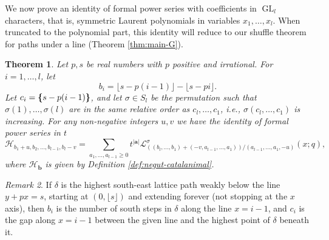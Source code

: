 \documentclass[12pt]{amsart}
\newtheorem{thm}{Theorem}[subsection]
\theoremstyle{definition}
\theoremstyle{remark}
\newtheorem{remark}[thm]{Remark}
\newcommand{\aA}{{\mathbf a}}
\newcommand{\bb}{{\mathbf b}}
\newcommand{\Hcat}{{\mathcal H}}  %
\newcommand{\Lcal}{{\mathcal L}}
\DeclareMathOperator{\GL}{GL}
\newcommand{\fp}[1]{{\boldsymbol \{} #1 {\boldsymbol \}}}
\begin{document}
We now prove an identity of formal power series with coefficients in
$\GL _{l}$ characters, that is, symmetric Laurent polynomials in
variables $x_{1},\ldots,x_{l}$.  When truncated to the polynomial
part, this identity will reduce to our shuffle theorem for paths under
a line (Theorem \ref{thm:main-G}).

\begin{thm}\label{thm:main-L}
Let $p ,s$ be real numbers with $p$ positive and irrational.  For $i =
1,\ldots,l$, let
\[
b_{i} = \lfloor s-p(i-1) \rfloor - \lfloor s-pi \rfloor.
\]
Let $c_{i} = \fp{s-p(i-1)}$, and let $\sigma \in S_{l}$ be the
permutation such that $\sigma (1),\ldots,\sigma (l)$ are in the same
relative order as $c_{l},\ldots,c_{1}$, i.e., $\sigma
(c_{l},\ldots,c_{1})$ is increasing.
For any non-negative integers $u,v$ we have the identity of formal
power series in $t$
\begin{equation}\label{e:main-L}
\Hcat _{b_{1}+u,b_{2},\ldots,b_{l-1},b_{l}-v} = \sum
_{a_{1},\ldots,a_{l-1}\geq 0} t^{|\aA |} \Lcal ^{\sigma
}_{((b_{l},\ldots,b_{1}) + (-v,a_{l-1},\ldots,a_{1})) /
(a_{l-1},\ldots,a_{1},-u)}(x;q),
\end{equation}
where $\Hcat _{\bb }$ is given by Definition
\ref{def:negut-catalanimal}.

\end{thm}

\begin{remark}\label{rem:extended-path}
If $\delta $ is the highest south-east lattice path weakly below the
line $y+px = s$, starting at $(0,\lfloor s \rfloor)$ and extending
forever (not stopping at the $x$ axis), then $b_{i}$ is the number of
south steps in $\delta $ along the line $x = i-1$, and $c_{i}$ is the
gap along $x=i-1$ between the given line and the highest point of
$\delta $ beneath it.
\end{remark}
\end{document}
